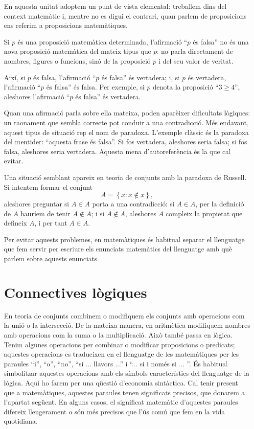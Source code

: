 \begin{observacio}
En aquesta unitat adoptem un punt de vista elemental: treballem dins del context matemàtic i, mentre no es digui el contrari, quan parlem de proposicions ens referim a proposicions matemàtiques.

Si $p$ és una proposició matemàtica determinada, l'afirmació \enquote{$p$ és falsa} no és una nova proposició matemàtica del mateix tipus que $p$: no parla directament de nombres, figures o funcions, sinó de la proposició $p$ i del seu valor de veritat.

Així, si $p$ és falsa, l'afirmació \enquote{$p$ és falsa} és vertadera; i, si $p$ és vertadera, l'afirmació \enquote{$p$ és falsa} és falsa. Per exemple, si $p$ denota la proposició \enquote{$3\geq4$}, aleshores l'afirmació \enquote{$p$ és falsa} és vertadera.

Quan una afirmació parla sobre ella mateixa, poden aparèixer dificultats lògiques: un raonament que sembla correcte pot conduir a una contradicció. Més endavant, aquest tipus de situació rep el nom de paradoxa. L'exemple clàssic és la paradoxa del mentider: \enquote{aquesta frase és falsa}. Si fos vertadera, aleshores seria falsa; si fos falsa, aleshores seria vertadera. Aquesta mena d'autoreferència és la que cal evitar.

Una situació semblant apareix en teoria de conjunts amb la paradoxa de Russell. Si intentem formar el conjunt
\begin{equation*}
A=\left\{x:x\notin x\right\},
\end{equation*}
aleshores preguntar si $A\in A$ porta a una contradicció: si $A\in A$, per la definició de $A$ hauríem de tenir $A\notin A$; i si $A\notin A$, aleshores $A$ compleix la propietat que defineix $A$, i per tant $A\in A$.

Per evitar aquests problemes, en matemàtiques és habitual separar el llenguatge que fem servir per escriure els enunciats matemàtics del llenguatge amb què parlem sobre aquests enunciats.
\end{observacio}

\section{Connectives lògiques}

En teoria de conjunts combinem o modifiquem els conjunts amb operacions com
la unió o la intersecció. De la mateixa manera, en aritmètica
modifiquem nombres amb operacions com la suma o la multiplicació. Això també passa en lògica. Tenim algunes operacions per combinar o
modificar proposicions o predicats; aquestes operacions es tradueixen en el
llenguatge de les matemàtiques per les paraules \enquote{i}, \enquote{o}, \enquote{no}, \enquote{si ...
llavors ...} i \enquote{... si i només si ... }. És habitual simbolitzar
aquestes operacions amb els símbols característics del llenguatge
de la lògica. Aquí ho farem per una qüestió d'economia sintàctica. Cal tenir present que a matemàtiques, aquestes paraules
tenen significats precisos, que donarem a l'apartat següent. En alguns
casos, el significat matemàtic d'aquestes paraules difereix lleugerament
o són més precisos que l'ús comú que fem en la vida
quotidiana.

